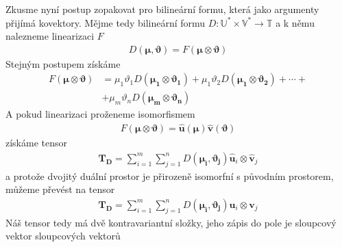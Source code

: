 \documentclass[a5paper,12pt]{amsbook}
\theoremstyle{definition}
\newcommand{\myvec}[1]{\bm{#1}}
\newcommand{\myspace}[1]{\mathbb{#1}}
\newcommand{\mycocovec}[1]{\mathbf{\widehat{#1}}}
\begin{document}
\medskip\noindent
Zkusme nyní postup zopakovat pro bilineární formu, která jako argumenty přijímá
kovektory. Mějme tedy bilineární formu $D:\myspace{U}^*\times\myspace{V}^*\rightarrow\myspace{T}$
a k němu nalezneme linearizaci $F$
\begin{equation*}
\begin{split}
D(\myvec{\mu}, \myvec{\vartheta}) = F(\myvec{\mu}\otimes\myvec{\vartheta})
\end{split}
\end{equation*}
Stejným postupem získáme
\begin{equation*}
\begin{split}
F(\myvec{\mu}\otimes\myvec{\vartheta}) &= \mu_1\vartheta_1 D(\myvec{\mu_1}\otimes\myvec{\vartheta_1})
  + \mu_1\vartheta_2 D(\myvec{\mu_1}\otimes\myvec{\vartheta_2})
  + \cdots + \\
  & + \mu_m\vartheta_n D(\myvec{\mu_m}\otimes\myvec{\vartheta_n})
\end{split}
\end{equation*}
A pokud linearizaci proženeme isomorfismem
\begin{equation*}
\begin{split}
F(\myvec{\mu}\otimes\myvec{\vartheta}) = \mycocovec{u}(\myvec{\mu})\mycocovec{v}(\myvec{\vartheta})
\end{split}
\end{equation*}
získáme tensor
\begin{equation*}
\begin{split}
\myvec{T_D} = \sum_{i=1}^{m}\sum_{j=1}^{n}D(\myvec{\mu_i}, \myvec{\vartheta_j})
  \mycocovec{u}_i\otimes\mycocovec{v}_j
\end{split}
\end{equation*}
a protože dvojitý duální prostor je přirozeně isomorfní s původním prostorem, můžeme převést na tensor
\begin{equation*}
\begin{split}
\myvec{T_D} = \sum_{i=1}^{m}\sum_{j=1}^{n}D(\myvec{\mu_i}, \myvec{\vartheta_j})
  \myvec{u}_i\otimes\myvec{v}_j
\end{split}
\end{equation*}
Náš tensor tedy  má dvě kontravariantní složky, jeho zápis do pole je sloupcový vektor sloupcových
vektorů
\end{document}
